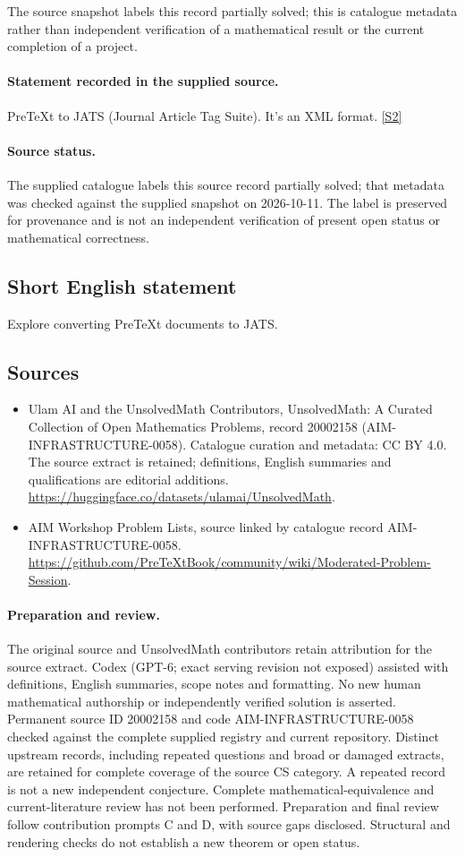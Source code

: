 \documentclass[11pt]{article}
\begin{document}
The source snapshot labels this record partially solved; this is catalogue metadata rather than independent verification of a mathematical result or the current completion of a project.
\paragraph{Statement recorded in the supplied source.}
PreTeXt to JATS (Journal Article Tag Suite). It's an XML format. \href{https://github.com/PreTeXtBook/community/wiki/Moderated-Problem-Session}{[S2]}
\paragraph{Source status.}
The supplied catalogue labels this source record partially solved; that metadata was checked against the supplied snapshot on 2026-10-11. The label is preserved for provenance and is not an independent verification of present open status or mathematical correctness.
\subsection{Short English statement}
Explore converting PreTeXt documents to JATS.
\subsection{Sources}
\begin{itemize}
\item[S1] Ulam AI and the UnsolvedMath Contributors, UnsolvedMath: A Curated Collection of Open Mathematics Problems, record 20002158 (AIM-INFRASTRUCTURE-0058). Catalogue curation and metadata: CC BY 4.0. The source extract is retained; definitions, English summaries and qualifications are editorial additions.
\url{https://huggingface.co/datasets/ulamai/UnsolvedMath}.
\item[S2] AIM Workshop Problem Lists, source linked by catalogue record AIM-INFRASTRUCTURE-0058.
\url{https://github.com/PreTeXtBook/community/wiki/Moderated-Problem-Session}.
\end{itemize}
\paragraph{Preparation and review.}
The original source and UnsolvedMath contributors retain attribution for the source extract. Codex (GPT-6; exact serving revision not exposed) assisted with definitions, English summaries, scope notes and formatting. No new human mathematical authorship or independently verified solution is asserted. Permanent source ID 20002158 and code AIM-INFRASTRUCTURE-0058 checked against the complete supplied registry and current repository. Distinct upstream records, including repeated questions and broad or damaged extracts, are retained for complete coverage of the source CS category. A repeated record is not a new independent conjecture. Complete mathematical-equivalence and current-literature review has not been performed. Preparation and final review follow contribution prompts C and D, with source gaps disclosed. Structural and rendering checks do not establish a new theorem or open status.
\label{end:20002158}
\end{document}

